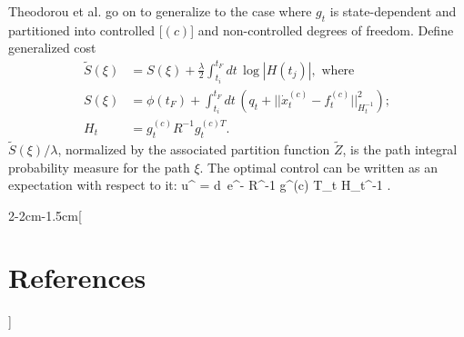 \documentclass[notitlepage,openany,11pt]{report}
\DeclareMathOperator{\Tr}{Tr}
\theoremstyle{plain}%
\numberwithin{equation}{section}
\begin{document}
Theodorou et al. go on to generalize to the case where $g_{t}$ is state-dependent and partitioned into controlled [$(c)$] and non-controlled degrees of freedom. Define generalized cost
\begin{align*}
\widetilde{S}(\xi) &= S(\xi) + \frac{\lambda}{2} \int_{t_i}^{t_{F}} \! dt \, \log |H(t_{j})|, \text{ where} \\
S(\xi) &= \phi(t_{F}) + \int_{t_i}^{t_{F}} \! dt \, \left( q_{t} + || \dot{x}^{(c)}_{t} - f^{(c)}_{t} ||^{2}_{H_{t}^{-1}} \right); \\
H_{t} &= g^{(c)}_{t} R^{-1}g^{(c) T}_{t}.
\end{align*}
$\widetilde{S}(\xi)/\lambda$, normalized by the associated partition function $\widetilde{Z}$, is the path integral probability measure for the path $\xi$.  The optimal control can be written as an expectation with respect to it: 
\be
u^{\ast} =  \int \! d\xi \, e^{-} R^{-1} g^{(c) T}_{t} H_{t}^{-1} \left[ g^{(c)}_{t} dw_{t} - \frac{\lambda}{2} H_{t} \Tr \, (H_{t}^{-1} \partial_{x} H_{t}) \right].
\ee 



\clearpage
{} %

\let\oldthebibliography=\thebibliography
\let\endoldthebibliography=\endthebibliography
\renewenvironment{thebibliography}[1]{%
    \begin{oldthebibliography}{#1}%
    \setlength{\parskip}{3pt plus 2pt minus 1pt}%
    \setlength{\itemsep}{3pt}%
}%
{%
    \end{oldthebibliography}%
}

\begin{adjmulticols*}{2}{-2cm}{-1.5cm}[\section*{References}] %

\noindent
\footnotesize %
\begin{flushleft}


\end{flushleft}
\normalsize

\end{adjmulticols*}
\end{document}
